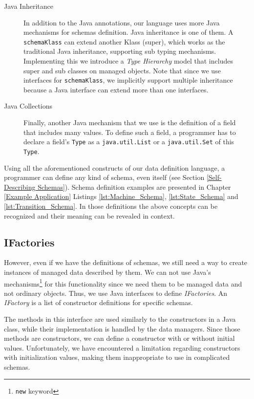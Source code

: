 \begin{description}
	\item [Java Inheritance] In addition to the Java annotations, our language uses more Java mechanisms for schemas definition. 
	Java inheritance is one of them. 
	A \texttt{schemaKlass} can extend another Klass (super), which works as the traditional Java inheritance, supporting sub typing mechanisms.
	Implementing this we introduce a \textit{Type Hierarchy} model that includes super and sub classes on managed objects.
	Note that since we use interfaces for \texttt{schemaKlass}, we implicitly support multiple inheritance because a Java interface can extend more than one interfaces.

	\item [Java Collections] Finally, another Java mechanism that we use is the definition of a field that includes many values.
	To define such a field, a programmer has to declare a field's \texttt{Type} as a \texttt{java.util.List} or a \texttt{java.util.Set} of this \texttt{Type}.

\end{description}

Using all the aforementioned constructs of our data definition language, a programmer can define any kind of schema, even itself (see Section \ref{Self-Describing Schemas}).
Schema definition examples are presented in Chapter \ref{Example Application} Listings \ref{lst:Machine_Schema}, \ref{lst:State_Schema} and \ref{lst:Transition_Schema}.
In those definitions the above concepts can be recognized and their meaning can be revealed in context.

\subsection{IFactories}\label{IFactories}
However, even if we have the definitions of schemas, we still need a way to create instances of managed data described by them.
We can not use Java's mechanisms\footnote{\texttt{new} keyword} for this functionality since we need them to be managed data and not ordinary objects.
Thus, we use Java interfaces to define \textit{IFactories}.
An \textit{IFactory} is a list of constructor definitions for specific schemas.

The methods in this interface are used similarly to the constructors in a Java class, while their implementation is handled by the data managers.
Since those methods are constructors, we can define a constructor with or without initial values.
Unfortunately, we have encountered a limitation regarding constructors with initialization values, making them inappropriate to use in complicated schemas.

